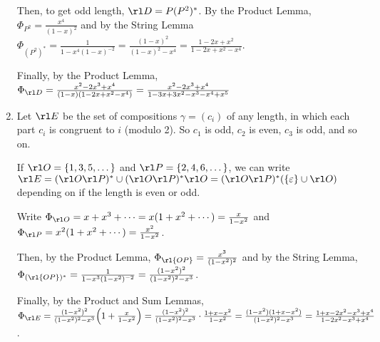 \begin{enumerate}
\begin{sol}
          Then, to get odd length, $\rl D = P(P^2)^*$.
          By the Product Lemma, $\Phi_{P^2} = \frac{x^4}{(1-x)^2}$
          and by the String Lemma $\Phi_{(P^2)^*} = \frac{1}{1-x^4(1-x)^{-2}}
            = \frac{(1-x)^2}{(1-x)^2-x^4} = \frac{1-2x+x^2}{1-2x+x^2-x^4}$.

          Finally, by the Product Lemma, $\Phi_{\rl D} = \frac{x^2-2x^3+x^4}{(1-x)(1-2x+x^2-x^4)}
            = \frac{x^2-2x^3+x^4}{1-3x+3x^2-x^3-x^4+x^5}$
        \end{sol}
  \item Let $\rl E$ be the set of compositions $\gamma = (c_i)$ of any length,
        in which each part $c_i$ is congruent to $i$ (modulo 2).
        So $c_1$ is odd, $c_2$ is even, $c_3$ is odd, and so on.
        \begin{sol}
          If $\rl O = \{1,3,5,\dotsc\}$ and $\rl P = \{2,4,6,\dotsc\}$,
          we can write $\rl E = (\rl O\rl P)^* \cup (\rl O\rl P)^*\rl O
            = (\rl O\rl P)^*(\{\varepsilon\} \cup \rl O)$
          depending on if the length is even or odd.

          Write $\Phi_{\rl O} = x + x^3 + \dotsb = x(1 + x^2 + \dotsb) = \frac{x}{1-x^2}$
          and $\Phi_{\rl P} = x^2(1 + x^2 + \dotsb) = \frac{x^2}{1-x^2}$.

          Then, by the Product Lemma, $\Phi_{\rl{OP}} = \frac{x^3}{(1-x^2)^2}$
          and by the String Lemma, $\Phi_{(\rl{OP})^*} = \frac{1}{1-x^3(1-x^2)^{-2}}
            = \frac{(1-x^2)^2}{(1-x^2)^2-x^3}$.

          Finally, by the Product and Sum Lemmas,
          $\Phi_{\rl E} = \frac{(1-x^2)^2}{(1-x^2)^2-x^3}\qty(1+\frac{x}{1-x^2})
            = \frac{(1-x^2)^2}{(1-x^2)^2-x^3}\cdot\frac{1+x-x^2}{1-x^2}
            = \frac{(1-x^2)(1+x-x^2)}{(1-x^2)^2-x^3}
            = \frac{1+x-2x^2-x^3+x^4}{1-2x^2-x^3+x^4}$.
        \end{sol}
\end{enumerate}
